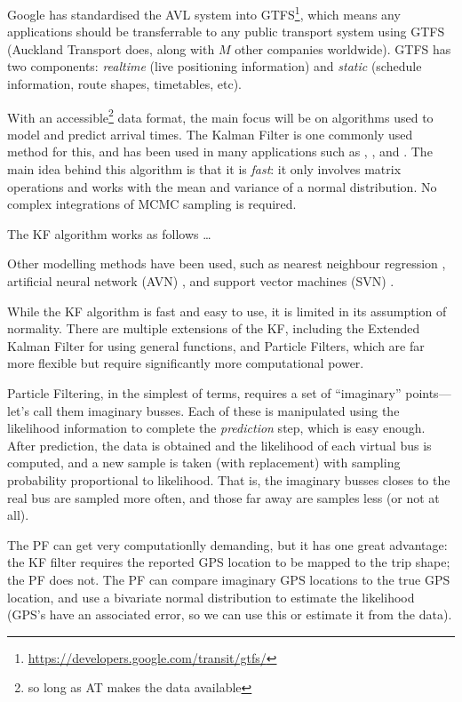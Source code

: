 \documentclass[12pt,a4paper]{article}
\begin{document}
Google has standardised the AVL system into GTFS\footnote{\url{https://developers.google.com/transit/gtfs/}}, 
which means any applications should be transferrable to any 
public transport system using GTFS (Auckland Transport does, along with $M$ other companies worldwide).
GTFS has two components: \emph{realtime} (live positioning information) and \emph{static} (schedule information,
route shapes, timetables, etc).


With an accessible\footnote{so long as AT makes the data available} data format, the main focus will be on algorithms
used to model and predict arrival times. The Kalman Filter is one commonly used method for this, and has been used
in many applications such as \cite{cathey-dailey:2003}, \cite{cn}, and \cite{cn}.
The main idea behind this algorithm is that it is \emph{fast}: it only involves matrix operations and works with 
the mean and variance of a normal distribution.
No complex integrations of MCMC sampling is required.


The KF algorithm works as follows \ldots

Other modelling methods have been used, such as
nearest neighbour regression \citep{chang-etal:2010},
artificial neural network (AVN) \citep{jeong-rilett:2005}, and
support vector machines (SVN) \citep{yu-etal:2006,yu-etal:2010,yu-etal:2011}.

While the KF algorithm is fast and easy to use, it is limited in its assumption of normality. 
There are multiple extensions of the KF, including the Extended Kalman Filter for using general functions, 
and Particle Filters, which are far more flexible but require significantly more computational power.

Particle Filtering, in the simplest of terms, requires a set of ``imaginary'' points---let's call them imaginary busses.
Each of these is manipulated using the likelihood information to complete the \emph{prediction} step,
which is easy enough.
After prediction, the data is obtained and the likelihood of each virtual bus is computed,
and a new sample is taken (with replacement) with sampling probability proportional to likelihood.
That is, the imaginary busses closes to the real bus are sampled more often, 
and those far away are samples less (or not at all).

The PF can get very computationlly demanding, but it has one great advantage:
the KF filter requires the reported GPS location to be mapped to the trip shape;
the PF does not.
The PF can compare imaginary GPS locations to the true GPS location, and use a bivariate normal distribution
to estimate the likelihood (GPS's have an associated error, so we can use this or estimate it from the data).
\end{document}
